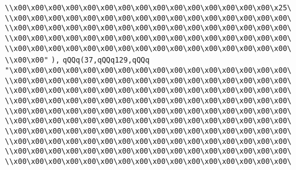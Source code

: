 \verb|\\x00\x00\x00\x00\x00\x00\x00\x00\x00\x00\x00\x00\x00\x00\x00\x25\|\newline
\verb|\\x00\x00\x00\x00\x00\x00\x00\x00\x00\x00\x00\x00\x00\x00\x00\x00\|\newline
\verb|\\x00\x00\x00\x00\x00\x00\x00\x00\x00\x00\x00\x00\x00\x00\x00\x00\|\newline
\verb|\\x00\x00\x00\x00\x00\x00\x00\x00\x00\x00\x00\x00\x00\x00\x00\x00\|\newline
\verb|\\x00\x00\x00\x00\x00\x00\x00\x00\x00\x00\x00\x00\x00\x00\x00\x00\|\newline
\verb|\\x00\x00"|\newline
\verb|),|\newline
\verb|qQQq(37,qQQq129,qQQq|\newline
\verb|"\x00\x00\x00\x00\x00\x00\x00\x00\x00\x00\x00\x00\x00\x00\x00\x00\|\newline
\verb|\\x00\x00\x00\x00\x00\x00\x00\x00\x00\x00\x00\x00\x00\x00\x00\x00\|\newline
\verb|\\x00\x00\x00\x00\x00\x00\x00\x00\x00\x00\x00\x00\x00\x00\x00\x00\|\newline
\verb|\\x00\x00\x00\x00\x00\x00\x00\x00\x00\x00\x00\x00\x00\x00\x00\x00\|\newline
\verb|\\x00\x00\x00\x00\x00\x00\x00\x00\x00\x00\x00\x00\x00\x00\x00\x00\|\newline
\verb|\\x00\x00\x00\x00\x00\x00\x00\x00\x00\x00\x00\x00\x00\x00\x00\x00\|\newline
\verb|\\x00\x00\x00\x00\x00\x00\x00\x00\x00\x00\x00\x00\x00\x00\x00\x00\|\newline
\verb|\\x00\x00\x00\x00\x00\x00\x00\x00\x00\x00\x00\x00\x00\x00\x00\x00\|\newline
\verb|\\x00\x00\x00\x00\x00\x00\x00\x00\x00\x00\x00\x00\x00\x00\x00\x00\|\newline
\verb|\\x00\x00\x00\x00\x00\x00\x00\x00\x00\x00\x00\x00\x00\x00\x00\x00\|\newline
